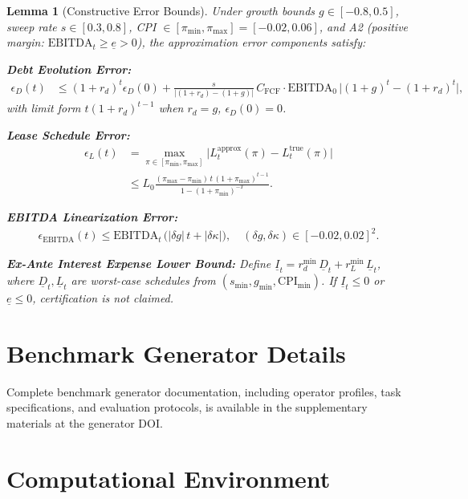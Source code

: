 \documentclass[11pt,a4paper]{article}
\newcommand{\EBITDA}{\mathrm{EBITDA}}
\newcommand{\CFCF}{C_{\text{FCF}}}
\newcommand{\pimin}{\pi_{\min}}
\newcommand{\pimax}{\pi_{\max}}
\newcommand{\CPI}{\mathrm{CPI}}
\theoremstyle{plain}
\newtheorem{lemma}{Lemma}
\theoremstyle{definition}
\begin{document}
\begin{lemma}[Constructive Error Bounds]
\label{lem:error_bounds}
Under growth bounds $g \in [-0.8,0.5]$, sweep rate $s \in [0.3,0.8]$, CPI $\in [\pimin,\pimax] = [-0.02,0.06]$, and A2 (positive margin: $\EBITDA_t \ge \underline{e} > 0$), the approximation error components satisfy:

\textbf{Debt Evolution Error:}
\begin{align}
\epsilon_D(t) &\le (1+r_d)^t \epsilon_D(0) + \frac{s}{|(1+r_d)-(1+g)|}\, \CFCF \cdot \EBITDA_0 \,\bigl|(1+g)^t - (1+r_d)^t\bigr|,
\end{align}
with limit form $t(1+r_d)^{t-1}$ when $r_d=g$, $\epsilon_D(0)=0$.

\textbf{Lease Schedule Error:}
\begin{align}
\epsilon_L(t) &= \max_{\pi \in [\pimin,\pimax]}\bigl|L^{\text{approx}}_t(\pi)-L^{\text{true}}_t(\pi)\bigr| \\
&\le L_0 \frac{(\pimax-\pimin)\, t\, (1+\pimax)^{t-1}}{1-(1+\pimin)^{-T}}.
\end{align}

\textbf{EBITDA Linearization Error:}
\begin{align}
\epsilon_{\text{EBITDA}}(t) \le \EBITDA_t \,\bigl(|\delta g|\, t + |\delta \kappa|\bigr), \quad (\delta g,\delta \kappa)\in[-0.02,0.02]^2.
\end{align}

\textbf{Ex-Ante Interest Expense Lower Bound:}
Define $\underline{I}_t = r_d^{\min}\,\underline{D}_t + r_L^{\min}\,\underline{L}_t$, where $\underline{D}_t,\underline{L}_t$ are worst-case schedules from $(s_{\min},g_{\min},\CPI_{\min})$. If $\underline{I}_t \le 0$ or $\underline{e}\le 0$, certification is not claimed.
\end{lemma}

\section{Benchmark Generator Details}
\label{app:benchmark}
Complete benchmark generator documentation, including operator profiles, task specifications, and evaluation protocols, is available in the supplementary materials at the generator DOI.

\section{Computational Environment}
\label{app:computation}
\end{document}
